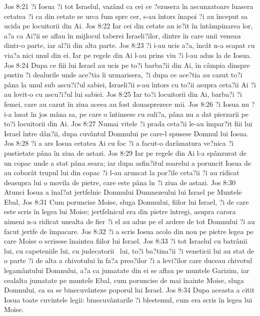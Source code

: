 Jos 8:21  ?i Iosua ?i tot Israelul, vazând ca cei ce ?ezusera în ascunzatoare luasera cetatea ?i ca din cetate se urca fum spre cer, s-au întors înapoi ?i au început sa ucida pe locuitorii din Ai.
Jos 8:22  Iar cei din cetate au ie?it în întâmpinarea lor, a?a ca Ai?ii se aflau în mijlocul taberei Israeli?ilor, dintre în care unii veneau dintr-o parte, iar al?ii din alta parte.
Jos 8:23  ?i i-au ucis a?a, încât n-a scapat cu via?a nici unul din ei. Iar pe regele din Ai l-au prins viu ?i l-au adus la de Iosua.
Jos 8:24  Dupa ce fiii lui Israel au ucis pe to?i barba?ii din Ai, în câmpia dinspre pustiu ?i dealurile unde ace?tia îi urmarisera, ?i dupa ce ace?tia au cazut to?i pâna la unul sub ascu?i?ul sabiei, Israeli?ii s-au întors cu to?ii asupra ceta?ii Ai ?i au lovit-o cu ascu?i?ul lui sabiei.
Jos 8:25  Iar to?i locuitorii din Ai, barba?i ?i femei, care au cazut în ziua aceea au fost douasprezece mii.
Jos 8:26  ?i Iosua nu ?i-a lasat în jos mâna sa, pe care o întinsese cu suli?a, pâna nu a dat pierzarii pe to?i locuitorii din Ai.
Jos 8:27  Numai vitele ?i prada ceta?ii le-au împar?it fiii lui Israel între dân?ii, dupa cuvântul Domnului pe care-l spusese Domnul lui Iosua.
Jos 8:28  ?i a ars Iosua cetatea Ai cu foc ?i a facut-o darâmatura ve?nica ?i pustietate pâna în ziua de astazi.
Jos 8:29  Iar pe regele din Ai l-a spânzurat de un copac unde a stat pâna seara; iar dupa asfin?itul soarelui a poruncit Iosua de au coborât trupul lui din copac ?i l-au aruncat la por?ile ceta?ii ?i au ridicat deasupra lui o movila de pietre, care este pâna în ?i ziua de astazi.
Jos 8:30  Atunci Iosua a înal?at jertfelnic Domnului Dumnezeului lui Israel pe Muntele Ebal,
Jos 8:31  Cum poruncise Moise, sluga Domnului, fiilor lui Israel, ?i de care este scris în legea lui Moise; jertfelnicul era din pietre întregi, asupra carora nimeni n-a ridicat unealta de fier ?i el au adus pe el ardere de tot Domnului ?i au facut jertfe de împacare.
Jos 8:32  ?i a scris Iosua acolo din nou pe pietre legea pe care Moise o scrisese înaintea fiilor lui Israel.
Jos 8:33  ?i tot Israelul cu batrânii lui, cu capeteniile lui, cu judecatorii  lui, to?i ba?tina?ii ?i veneticii lui au stat de o parte ?i de alta a chivotului în fa?a preo?ilor ?i a levi?ilor care duceau chivotul legamântului Domnului, a?a ca jumatate din ei se aflau pe muntele Garizim, iar cealalta jumatate pe muntele Ebal, cum poruncise de mai înainte Moise, sluga Domnului, ca sa se binecuvânteze poporul lui Israel.
Jos 8:34  Dupa aceasta a citit Iosua toate cuvintele legii: binecuvântarile ?i blestemul, cum era scris în legea lui Moise.
